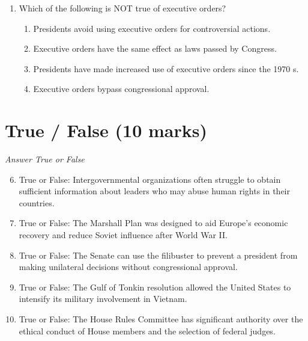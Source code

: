 \documentclass[12pt]{article}
\begin{document}
\begin{enumerate}[label=\arabic*.]
\begin{enumerate}[label=(\alph*)]
    \item Irrationality on the part of the leadership
    \item Costs of free trade are concentrated, but benefits are dispersed
    \item Regime type
    \item International conflict prevents trade
\end{enumerate}
\item Which of the following is NOT true of executive orders?
\begin{enumerate}[label=(\alph*)]
    \item Presidents avoid using executive orders for controversial actions.
    \item Executive orders have the same effect as laws passed by Congress.
    \item Presidents have made increased use of executive orders since the 1970 s.
    \item Executive orders bypass congressional approval.
\end{enumerate}
\end{enumerate}

\section*{True / False (10 marks)}
\textit{Answer True or False}
\begin{enumerate}[label=\arabic*.]
\setcounter{enumi}{5}
\item True or False: Intergovernmental organizations often struggle to obtain sufficient information about leaders who may abuse human rights in their countries.
\item True or False: The Marshall Plan was designed to aid Europe's economic recovery and reduce Soviet influence after World War II.
\item True or False: The Senate can use the filibuster to prevent a president from making unilateral decisions without congressional approval.
\item True or False: The Gulf of Tonkin resolution allowed the United States to intensify its military involvement in Vietnam.
\item True or False: The House Rules Committee has significant authority over the ethical conduct of House members and the selection of federal judges.
\end{enumerate}
\end{document}
